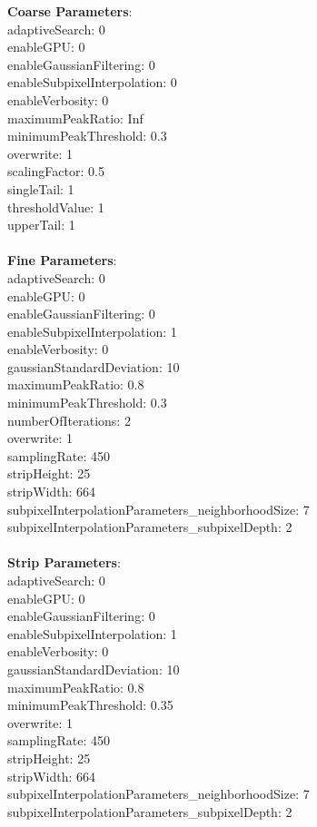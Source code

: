 \documentclass[11pt]{article}
\begin{document}
\textbf{Coarse Parameters}: \\
adaptiveSearch: 0\\
enableGPU: 0\\
enableGaussianFiltering: 0\\
enableSubpixelInterpolation: 0\\
enableVerbosity: 0\\
maximumPeakRatio: Inf\\
minimumPeakThreshold: 0.3\\
overwrite: 1\\
scalingFactor: 0.5\\
singleTail: 1\\
thresholdValue: 1\\
upperTail: 1\\
\\
\textbf{Fine Parameters}: \\
adaptiveSearch: 0\\
enableGPU: 0\\
enableGaussianFiltering: 0\\
enableSubpixelInterpolation: 1\\
enableVerbosity: 0\\
gaussianStandardDeviation: 10\\
maximumPeakRatio: 0.8\\
minimumPeakThreshold: 0.3\\
numberOfIterations: 2\\
overwrite: 1\\
samplingRate: 450\\
stripHeight: 25\\
stripWidth: 664\\
subpixelInterpolationParameters\_neighborhoodSize: 7\\
subpixelInterpolationParameters\_subpixelDepth: 2\\
\\
\textbf{Strip Parameters}: \\
adaptiveSearch: 0\\
enableGPU: 0\\
enableGaussianFiltering: 0\\
enableSubpixelInterpolation: 1\\
enableVerbosity: 0\\
gaussianStandardDeviation: 10\\
maximumPeakRatio: 0.8\\
minimumPeakThreshold: 0.35\\
overwrite: 1\\
samplingRate: 450\\
stripHeight: 25\\
stripWidth: 664\\
subpixelInterpolationParameters\_neighborhoodSize: 7\\
subpixelInterpolationParameters\_subpixelDepth: 2\\
\\
\newpage
\end{document}
